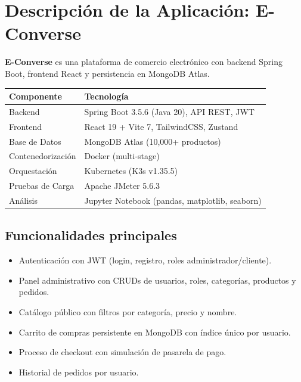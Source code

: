 \documentclass[11pt,a4paper]{article}
\begin{document}
\section{Descripción de la Aplicación: E-Converse}

\textbf{E-Converse} es una plataforma de comercio electrónico con backend Spring Boot, frontend React y persistencia en MongoDB Atlas.

\begin{center}
\begin{tabular}{ll}
\toprule
\textbf{Componente} & \textbf{Tecnología} \\
\midrule
Backend & Spring Boot 3.5.6 (Java 20), API REST, JWT \\
Frontend & React 19 + Vite 7, TailwindCSS, Zustand \\
Base de Datos & MongoDB Atlas (10,000+ productos) \\
Contenedorización & Docker (multi-stage) \\
Orquestación & Kubernetes (K3s v1.35.5) \\
Pruebas de Carga & Apache JMeter 5.6.3 \\
Análisis & Jupyter Notebook (pandas, matplotlib, seaborn) \\
\bottomrule
\end{tabular}
\end{center}

\subsection{Funcionalidades principales}

\begin{itemize}
    \item Autenticación con JWT (login, registro, roles administrador/cliente).
    \item Panel administrativo con CRUDs de usuarios, roles, categorías, productos y pedidos.
    \item Catálogo público con filtros por categoría, precio y nombre.
    \item Carrito de compras persistente en MongoDB con índice único por usuario.
    \item Proceso de checkout con simulación de pasarela de pago.
    \item Historial de pedidos por usuario.
\end{itemize}
\end{document}
